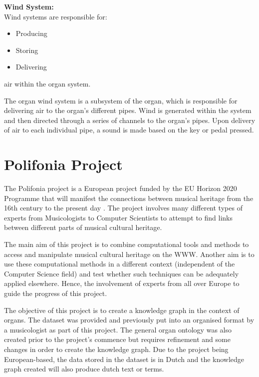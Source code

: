 \medskip
\noindent \textbf{Wind System:}
\\ Wind systems are responsible for:

\vspace{-0.15cm}
\begin{itemize}
    \itemsep0em 
\item Producing
\vspace{-0.1cm}
\item Storing
\vspace{-0.1cm}
\item Delivering
\end{itemize}
\vspace{-0.15cm}

\noindent air within the organ system.

The organ wind system is a subsystem of the organ, which is responsible for delivering air to the organ's different pipes. Wind is generated within the system and then directed through a series of channels to the organ's pipes. Upon delivery of air to each individual pipe, a sound is made based on the key or pedal pressed. \cite{organvideo}

\section{Polifonia Project}
\hspace{0.5cm} The Polifonia project is a European project funded by the EU Horizon 2020 Programme that will manifest the connections between musical heritage from the 16th century to the present day \cite{polifonia}. The project involves many different types of experts from Musicologists to Computer Scientists to attempt to find links between different parts of musical cultural heritage. 

The main aim of this project is to combine computational tools and methods to access and manipulate musical cultural heritage on the WWW. Another aim is to use these computational methods in a different context (independent of the Computer Science field) and test whether such techniques can be adequately applied elsewhere. Hence, the involvement of experts from all over Europe to guide the progress of this project. \cite{polifoniaproject}

The objective of this project is to create a knowledge graph in the context of organs. The dataset was provided and previously put into an organised format by a musicologist as part of this project. The general organ ontology was also created prior to the project's commence but requires refinement and some changes in order to create the knowledge graph. Due to the project being European-based, the data stored in the dataset is in Dutch and the knowledge graph created will also produce dutch text or terms.  


